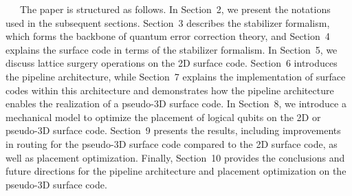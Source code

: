\documentclass[a4paper,11pt]{ltjsarticle}
\begin{document}
{    \ \ \ The paper is structured as follows. In Section~2, we present the notations used in the subsequent sections. Section~3 describes the stabilizer formalism, which forms the backbone of quantum error correction theory, and Section~4 explains the surface code in terms of the stabilizer formalism. In Section~5, we discuss lattice surgery operations on the 2D surface code. Section~6 introduces the pipeline architecture, while Section~7 explains the implementation of surface codes within this architecture and demonstrates how the pipeline architecture enables the realization of a pseudo-3D surface code. In Section~8, we introduce a mechanical model to optimize the placement of logical qubits on the 2D or pseudo-3D surface code. Section~9 presents the results, including improvements in routing for the pseudo-3D surface code compared to the 2D surface code, as well as placement optimization. Finally, Section~10 provides the conclusions and future directions for the pipeline architecture and placement optimization on the pseudo-3D surface code.\\
}
\end{document}
